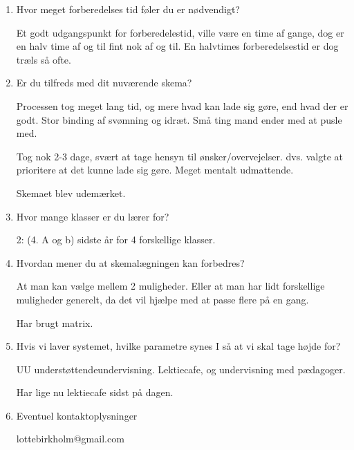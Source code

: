 \begin{enumerate}
    
    \item Hvor meget forberedelses tid føler du er nødvendigt?
	
	Et godt udgangspunkt for forberedelestid, ville være en time af gange, dog er en halv time af og til fint nok af og til. En halvtimes forberedelsestid er dog træls så ofte.


    \item Er du tilfreds med dit nuværende skema?
	
	Processen tog meget lang tid, og mere hvad kan lade sig gøre, end hvad der er godt. Stor binding af svømning og idræt. Små ting mand ender med at pusle med.
	
	Tog nok 2-3 dage, svært at tage hensyn til ønsker/overvejelser. dvs. valgte at prioritere at det kunne lade sig gøre. Meget mentalt udmattende.
	
	Skemaet blev udemærket.
    
    
    \item Hvor mange klasser er du lærer for?
	
	2: (4. A og b) sidste år for 4 forskellige klasser. 
    
    
    \item Hvordan mener du at skemalægningen kan forbedres?
	
	At man kan vælge mellem 2 muligheder. Eller at man har lidt forskellige muligheder generelt, da det vil hjælpe med at passe flere på en gang. 
	
	Har brugt matrix. 
    
    
    \item Hvis vi laver systemet, hvilke parametre synes I så at vi skal tage højde for?
	
	UU understøttendeundervisning. Lektiecafe, og undervisning med pædagoger.
	
	Har lige nu lektiecafe sidst på dagen.  
    
    
    \item Eventuel kontaktoplysninger
	
	lottebirkholm@gmail.com
\end{enumerate}
